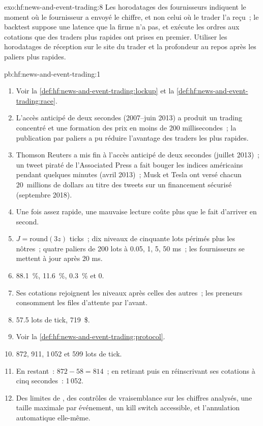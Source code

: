 \begin{solution}{exo:hf:news-and-event-trading:8}
Les horodatages des fournisseurs indiquent le moment où le fournisseur a envoyé le chiffre, et non celui où le trader l'a reçu~; le backtest suppose une latence que la firme n'a pas, et
exécute les ordres aux cotations que des traders plus rapides ont prises en premier. Utiliser les horodatages de réception sur le site du trader et la profondeur au repos après les paliers plus rapides.
\end{solution}

\begin{solution}{pb:hf:news-and-event-trading:1}
\begin{enumerate}
\item Voir la \cref{def:hf:news-and-event-trading:lockup} et la \cref{def:hf:news-and-event-trading:race}.
\item L'accès anticipé de deux secondes (2007--juin 2013) a produit un trading concentré et une formation des prix en moins de 200 millisecondes~; la publication par paliers a pu
réduire l'avantage des traders les plus rapides.
\item Thomson Reuters a mis fin à l'accès anticipé de deux secondes (juillet 2013)~; un tweet piraté de l'Associated Press a fait bouger les indices américains pendant quelques minutes (avril 2013)~; Musk et
Tesla ont versé chacun 20~millions de dollars au titre des tweets sur un financement sécurisé (septembre 2018).
\item Une fois assez rapide, une mauvaise lecture coûte plus que le fait d'arriver en second.
\item $J=\mathrm{round}(3z)$ ticks~; dix niveaux de cinquante lots périmés plus les nôtres~; quatre paliers de 200 lots à 0.05, 1, 5, 50 ms~; les fournisseurs se mettent à jour après 20
ms.
\item 88.1~\%, 11.6~\%, 0.3~\% et 0.
\item Ses cotations rejoignent les niveaux après celles des autres~; les preneurs consomment les files d'attente par l'avant.
\item 57.5 lots de tick, 719~\$.
\item Voir la \cref{def:hf:news-and-event-trading:protocol}.
\item 872, 911, 1\,052 et 599 lots de tick.
\item En restant~: $872-58=814$~; en retirant puis en réinscrivant ses cotations à cinq secondes~: 1\,052.
\item Des limites de , des contrôles de vraisemblance sur les chiffres analysés, une taille maximale par événement, un kill switch accessible, et l'annulation automatique elle-même.

\end{enumerate}
\end{solution}
